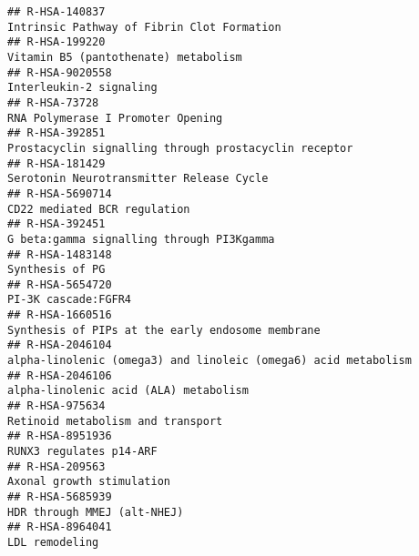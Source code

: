 \documentclass[
]{article}
\begin{document}
\begin{verbatim}
## R-HSA-140837                                                                                            Intrinsic Pathway of Fibrin Clot Formation
## R-HSA-199220                                                                                                  Vitamin B5 (pantothenate) metabolism
## R-HSA-9020558                                                                                                              Interleukin-2 signaling
## R-HSA-73728                                                                                                      RNA Polymerase I Promoter Opening
## R-HSA-392851                                                                                 Prostacyclin signalling through prostacyclin receptor
## R-HSA-181429                                                                                              Serotonin Neurotransmitter Release Cycle
## R-HSA-5690714                                                                                                         CD22 mediated BCR regulation
## R-HSA-392451                                                                                             G beta:gamma signalling through PI3Kgamma
## R-HSA-1483148                                                                                                                      Synthesis of PG
## R-HSA-5654720                                                                                                                  PI-3K cascade:FGFR4
## R-HSA-1660516                                                                                     Synthesis of PIPs at the early endosome membrane
## R-HSA-2046104                                                                       alpha-linolenic (omega3) and linoleic (omega6) acid metabolism
## R-HSA-2046106                                                                                                alpha-linolenic acid (ALA) metabolism
## R-HSA-975634                                                                                                     Retinoid metabolism and transport
## R-HSA-8951936                                                                                                              RUNX3 regulates p14-ARF
## R-HSA-209563                                                                                                             Axonal growth stimulation
## R-HSA-5685939                                                                                                          HDR through MMEJ (alt-NHEJ)
## R-HSA-8964041                                                                                                                       LDL remodeling

\end{verbatim}
\end{document}
